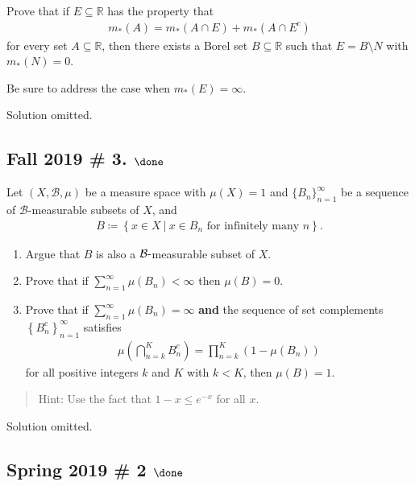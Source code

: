 Prove that if \(E\subseteq {\mathbb{R}}\) has the property that
\begin{align*}
m_*(A) = m_*(A\cap E) + m_*(A\cap E^c)
\end{align*}
for every set \(A\subseteq {\mathbb{R}}\), then there exists a Borel set
\(B\subseteq {\mathbb{R}}\) such that \(E = B\setminus N\) with
\(m_*(N) = 0\).

Be sure to address the case when \(m_*(E) = \infty\).

Solution omitted.

\hypertarget{fall-2019-3.-done}{%
\subsection{\texorpdfstring{Fall 2019 \# 3.
\(\done\)}{Fall 2019 \# 3. \textbackslash done}}\label{fall-2019-3.-done}}

Let \((X, \mathcal B, \mu)\) be a measure space with \(\mu(X) = 1\) and
\(\{B_n\}_{n=1}^\infty\) be a sequence of \(\mathcal B\)-measurable
subsets of \(X\), and
\begin{align*}
B \coloneqq\left\{{x\in X {~\mathrel{\Big|}~}x\in B_n \text{ for infinitely many } n}\right\}.
\end{align*}

\begin{enumerate}
\def\labelenumi{\alph{enumi}.}
\item
  Argue that \(B\) is also a \(\mathcal{B} {\hbox{-}}\)measurable subset
  of \(X\).
\item
  Prove that if \(\sum_{n=1}^\infty \mu(B_n) < \infty\) then
  \(\mu(B)= 0\).
\item
  Prove that if \(\sum_{n=1}^\infty \mu(B_n) = \infty\) \textbf{and} the
  sequence of set complements \(\left\{{B_n^c}\right\}_{n=1}^\infty\)
  satisfies
  \begin{align*}
  \mu\left(\bigcap_{n=k}^{K} B_{n}^{c}\right)=\prod_{n=k}^{K}\left(1-\mu\left(B_{n}\right)\right)
  \end{align*}
  for all positive integers \(k\) and \(K\) with \(k < K\), then
  \(\mu(B) = 1\).
\end{enumerate}

\begin{quote}
Hint: Use the fact that \(1 - x ≤ e^{-x}\) for all \(x\).
\end{quote}

Solution omitted.

\hypertarget{spring-2019-2-done}{%
\subsection{\texorpdfstring{Spring 2019 \# 2
\(\done\)}{Spring 2019 \# 2 \textbackslash done}}\label{spring-2019-2-done}}

